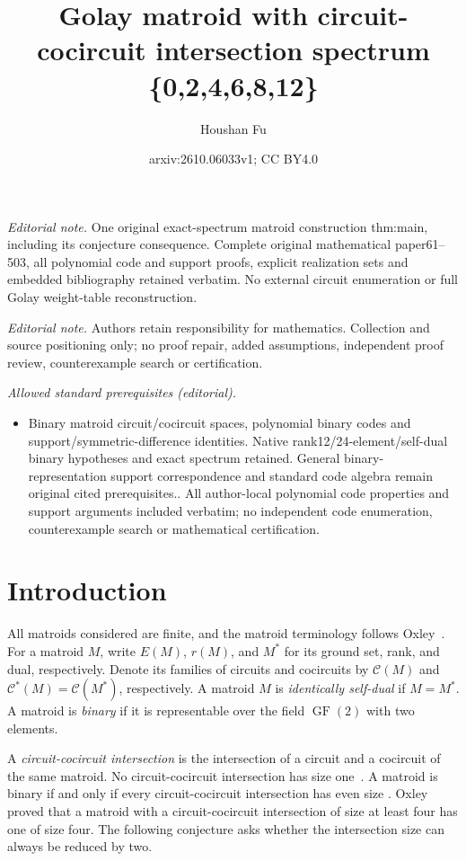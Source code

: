 \documentclass[11pt]{article}
\title{Golay matroid with circuit-cocircuit intersection spectrum \{0,2,4,6,8,12\}}
\author{Houshan Fu}
\date{arxiv:2610.06033v1; CC BY4.0}
\numberwithin{equation}{section}
\DeclareMathOperator{\GF}{GF}
\begin{document}
\maketitle
\noindent\textit{Editorial note.} One original exact-spectrum matroid construction thm:main, including its conjecture consequence. Complete original mathematical paper61--503, all polynomial code and support proofs, explicit realization sets and embedded bibliography retained verbatim. No external circuit enumeration or full Golay weight-table reconstruction.\par\medskip
\noindent\textit{Editorial note.} Authors retain responsibility for mathematics. Collection and source positioning only; no proof repair, added assumptions, independent proof review, counterexample search or certification.\par\medskip
\noindent\textit{Allowed standard prerequisites (editorial).}\begin{itemize}
\item Binary matroid circuit/cocircuit spaces, polynomial binary codes and support/symmetric-difference identities. Native rank12/24-element/self-dual binary hypotheses and exact spectrum retained. General binary-representation support correspondence and standard code algebra remain original cited prerequisites.. All author-local polynomial code properties and support arguments included verbatim; no independent code enumeration, counterexample search or mathematical certification.
\end{itemize}\medskip
\section{Introduction}
All matroids considered are finite, and the matroid terminology follows
Oxley~\cite{Oxley2011}. For a matroid $M$, write $E(M)$, $r(M)$, and $M^*$
for its ground set, rank, and dual, respectively. Denote its families of
circuits and cocircuits by $\mathcal C(M)$ and
$\mathcal C^*(M)=\mathcal C(M^*)$, respectively.
A matroid $M$ is \emph{identically self-dual} if $M=M^*$.
A matroid is \emph{binary} if it is representable over the field
$\GF(2)$ with two elements.

A \emph{circuit-cocircuit intersection} is the intersection of a circuit
and a cocircuit of the same matroid. No circuit-cocircuit intersection has
size one~\cite[Proposition~2.1.11]{Oxley2011}. A matroid is binary if and
only if every circuit-cocircuit intersection has even size
\cite[Theorem~9.1.2]{Oxley2011}.
Oxley~\cite[Theorem~2.7]{Oxley1984} proved that a matroid with a circuit-cocircuit
intersection of size at least four has one of size four.
The following conjecture asks whether the intersection size can always
be reduced by two.
\end{document}
